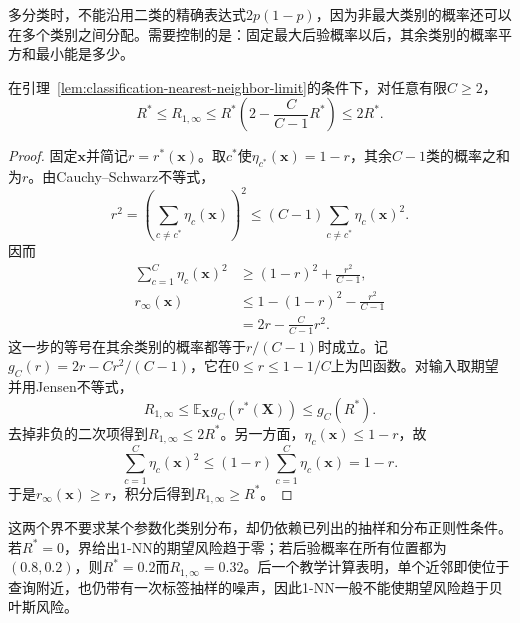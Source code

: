 多分类时，不能沿用二类的精确表达式$2p(1-p)$，因为非最大类别的概率还可以在多个类别之间分配。需要控制的是：固定最大后验概率以后，其余类别的概率平方和最小能是多少。

\begin{theorem}
  \label{thm:classification-cover-hart-multiclass}
  在引理~\ref{lem:classification-nearest-neighbor-limit}的条件下，对任意有限$C\geq2$，
  \begin{equation}
    R^\ast\leq R_{1,\infty}
    \leq R^\ast\left(2-\frac{C}{C-1}R^\ast\right)
    \leq2R^\ast.
    \label{eq:classification-cover-hart-multiclass}
  \end{equation}
\end{theorem}

\begin{proof}
  固定$\bm{x}$并简记$r=r^\ast(\bm{x})$。取$c^\ast$使$\eta_{c^\ast}(\bm{x})=1-r$，其余$C-1$类的概率之和为$r$。由Cauchy--Schwarz不等式，
  \[
    r^2
    =\left(\sum_{c\neq c^\ast}\eta_c(\bm{x})\right)^2
    \leq(C-1)\sum_{c\neq c^\ast}\eta_c(\bm{x})^2.
  \]
  因而
  \begin{align*}
    \sum_{c=1}^{C}\eta_c(\bm{x})^2
    &\geq(1-r)^2+\frac{r^2}{C-1},\\
    r_\infty(\bm{x})
    &\leq1-(1-r)^2-\frac{r^2}{C-1}\\
    &=2r-\frac{C}{C-1}r^2.
  \end{align*}
  这一步的等号在其余类别的概率都等于$r/(C-1)$时成立。记$g_C(r)=2r-Cr^2/(C-1)$，它在$0\leq r\leq1-1/C$上为凹函数。对输入取期望并用Jensen不等式，
  \[
    R_{1,\infty}
    \leq\mathbb{E}_{\bm{X}}g_C(r^\ast(\bm{X}))
    \leq g_C(R^\ast).
  \]
  去掉非负的二次项得到$R_{1,\infty}\leq2R^\ast$。另一方面，$\eta_c(\bm{x})\leq1-r$，故
  \[
    \sum_{c=1}^{C}\eta_c(\bm{x})^2
    \leq(1-r)\sum_{c=1}^{C}\eta_c(\bm{x})=1-r.
  \]
  于是$r_\infty(\bm{x})\geq r$，积分后得到$R_{1,\infty}\geq R^\ast$。
\end{proof}

这两个界不要求某个参数化类别分布，却仍依赖已列出的抽样和分布正则性条件。若$R^\ast=0$，界给出1-NN的期望风险趋于零；若后验概率在所有位置都为$(0.8,0.2)$，则$R^\ast=0.2$而$R_{1,\infty}=0.32$。后一个教学计算表明，单个近邻即使位于查询附近，也仍带有一次标签抽样的噪声，因此1-NN一般不能使期望风险趋于贝叶斯风险。

